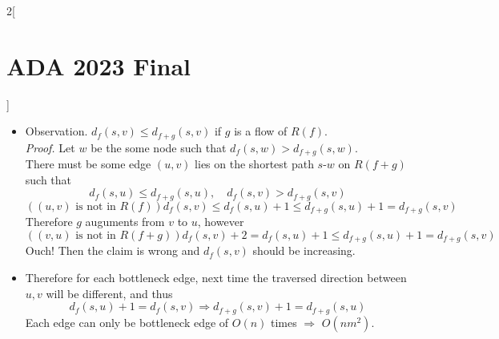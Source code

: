 \documentclass[10pt,a4paper]{report}
\begin{document}
\begin{multicols}{2}[\section*{ADA 2023 Final}]
\begin{itemize}
    \begin{itemize}
      \item Observation. $d_f(s, v) \leq d_{f+g}(s, v)$ if $g$ is a flow of $R(f)$. \\
            \textit{Proof.} Let $w$ be the some node such that $d_f(s, w) > d_{f+g}(s, w)$. \\
            There must be some edge $(u, v)$ lies on the shortest path $s$-$w$ on $R(f+g)$ such that 
            \[ d_f(s, u) \leq d_{f+g}(s, u), \quad d_f(s, v) > d_{f+g}(s, v) \]
            \[ \left(\text{$(u, v)$ is not in $R(f)$}\right)  d_f(s, v) \leq d_f(s, u) + 1 \leq d_{f+g}(s, u) + 1 = d_{f+g}(s, v)  \]
            Therefore $g$ auguments from $v$ to $u$, however
            \[ \left(\text{$(v, u)$ is not in $R(f+g)$}\right) d_f(s, v) + 2 = d_f(s, u) + 1 \leq d_{f+g}(s, u) + 1 = d_{f+g}(s, v) \]
            Ouch! Then the claim is wrong and $d_f(s, v)$ should be increasing.       
      \item Therefore for each bottleneck edge, next time the traversed direction between $u, v$ will be different, and thus
            \[ d_f(s, u) + 1 = d_f(s, v) \Longrightarrow d_{f+g}(s, v) + 1 = d_{f+g}(s, u) \]
            Each edge can only be bottleneck edge of $O(n)$ times $\Longrightarrow$ $O(nm^2)$.
    \end{itemize}
  \end{itemize}


\end{multicols}
\end{document}

